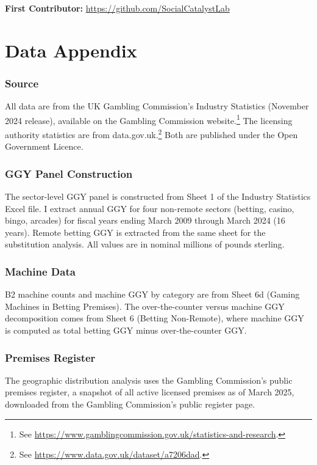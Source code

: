 \documentclass[12pt]{article}
\begin{document}
\noindent\textbf{First Contributor:} \url{https://github.com/SocialCatalystLab}

\label{apep_main_text_end}
\newpage


\newpage
\appendix

\section{Data Appendix}

\subsubsection*{Source} All data are from the UK Gambling Commission's Industry Statistics (November 2024 release), available on the Gambling Commission website.\footnote{See \url{https://www.gamblingcommission.gov.uk/statistics-and-research}.} The licensing authority statistics are from data.gov.uk.\footnote{See \url{https://www.data.gov.uk/dataset/a7206dad}.} Both are published under the Open Government Licence.

\subsubsection*{GGY Panel Construction} The sector-level GGY panel is constructed from Sheet 1 of the Industry Statistics Excel file. I extract annual GGY for four non-remote sectors (betting, casino, bingo, arcades) for fiscal years ending March 2009 through March 2024 (16 years). Remote betting GGY is extracted from the same sheet for the substitution analysis. All values are in nominal millions of pounds sterling.

\subsubsection*{Machine Data} B2 machine counts and machine GGY by category are from Sheet 6d (Gaming Machines in Betting Premises). The over-the-counter versus machine GGY decomposition comes from Sheet 6 (Betting Non-Remote), where machine GGY is computed as total betting GGY minus over-the-counter GGY.

\subsubsection*{Premises Register} The geographic distribution analysis uses the Gambling Commission's public premises register, a snapshot of all active licensed premises as of March 2025, downloaded from the Gambling Commission's public register page.
\end{document}
